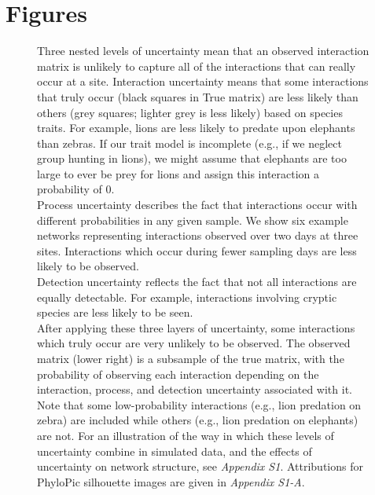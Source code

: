 \documentclass[12pt]{article}
\begin{document}
\clearpage


\section*{Figures}

  \begin{figure}[h!]
    \caption{Three nested levels of uncertainty mean that an observed interaction matrix is unlikely to capture all of the interactions that can really occur at a site. Interaction uncertainty means that some interactions that truly occur (black squares in True matrix) are less likely than others (grey squares; lighter grey is less likely) based on species traits. For example, lions are less likely to predate upon elephants than zebras. If our trait model is incomplete (e.g., if we neglect group hunting in lions), we might assume that elephants are too large to ever be prey for lions and assign this interaction a probability of 0.\\
    \indent Process uncertainty describes the fact that interactions occur with different probabilities in any given sample. We show six example networks representing interactions observed over two days at three sites. Interactions which occur during fewer sampling days are less likely to be observed.\\
    \indent Detection uncertainty reflects the fact that not all interactions are equally detectable. For example, interactions involving cryptic species are less likely to be seen.\\
    \indent After applying these three layers of uncertainty, some interactions which truly occur are very unlikely to be observed. The observed matrix (lower right) is a subsample of the true matrix, with the probability of observing each interaction depending on the interaction, process, and detection uncertainty associated with it. Note that some low-probability interactions (e.g., lion predation on zebra) are included while others (e.g., lion predation on elephants) are not. For an illustration of the way in which these levels of uncertainty combine in simulated data, and the effects of uncertainty on network structure, see \emph{Appendix S1}. Attributions for PhyloPic silhouette images are given in \emph{Appendix S1-A}.}
    \label{conceptual_fig}
    \begin{center}

\end{center}
\end{figure}
\end{document}

